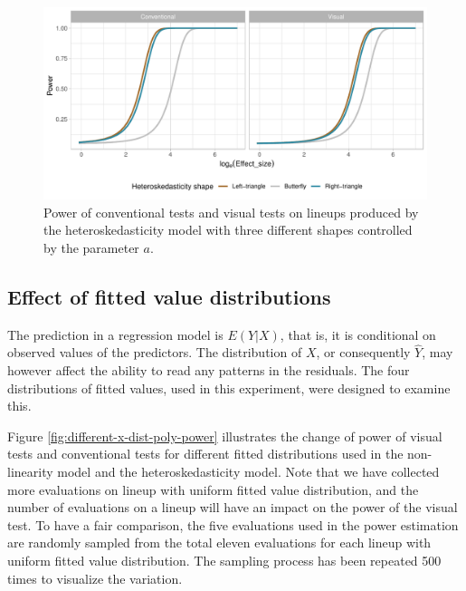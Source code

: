 \documentclass[]{interact}
\theoremstyle{plain}%
\theoremstyle{definition}
\theoremstyle{remark}
\begin{document}
\begin{figure}

{\centering \includegraphics[width=1\linewidth]{paper_comparison_files/figure-latex/heter-power-uniform-a-1} 

}

\caption{Power of conventional tests and visual tests on lineups produced by the heteroskedasticity model with three different shapes controlled by the parameter $a$.}\label{fig:heter-power-uniform-a}
\end{figure}

\hypertarget{effect-of-fitted-value-distributions}{%
\subsection{Effect of fitted value
distributions}\label{effect-of-fitted-value-distributions}}

The prediction in a regression model is \(E(Y|X)\), that is, it is
conditional on observed values of the predictors. The distribution of
\(X\), or consequently \(\hat{Y}\), may however affect the ability to
read any patterns in the residuals. The four distributions of fitted
values, used in this experiment, were designed to examine this.

Figure \ref{fig:different-x-dist-poly-power} illustrates the change of
power of visual tests and conventional tests for different fitted
distributions used in the non-linearity model and the heteroskedasticity
model. Note that we have collected more evaluations on lineup with
uniform fitted value distribution, and the number of evaluations on a
lineup will have an impact on the power of the visual test. To have a
fair comparison, the five evaluations used in the power estimation are
randomly sampled from the total eleven evaluations for each lineup with
uniform fitted value distribution. The sampling process has been
repeated 500 times to visualize the variation.
\end{document}
